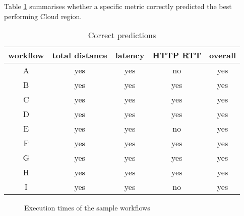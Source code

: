\documentclass[10pt, conference, compsocconf]{IEEEtran}
\begin{document}
Table \ref{tab:factor_predictions} summarises whether a specific metric correctly predicted the best performing Cloud region.

\begin{table}[!t]
\renewcommand{\arraystretch}{1.2}
\caption{Correct predictions}
\label{tab:factor_predictions}
\centering
\begin{tabular}{|c|c|c|c||c|}
\hline
workflow  & total distance & latency & HTTP RTT & overall\\
\hline
A   & yes & yes & no & yes     \\
B   & yes & yes & yes & yes    \\
C   & yes & yes & yes & yes     \\
D   & yes & yes & yes & yes     \\
E   & yes & yes & no & yes     \\
F   & yes & yes & yes & yes     \\
G   & yes & yes & yes & yes    \\
H   & yes & yes & yes & yes\\
I   & yes & yes & no  & yes\\
\hline
\end{tabular}
\end{table}


\begin{figure*}[htp]
\begin{center}
\label{fig:boxplots}




\caption{Execution times of the sample workflows}
\end{center}
\end{figure*}
\end{document}
